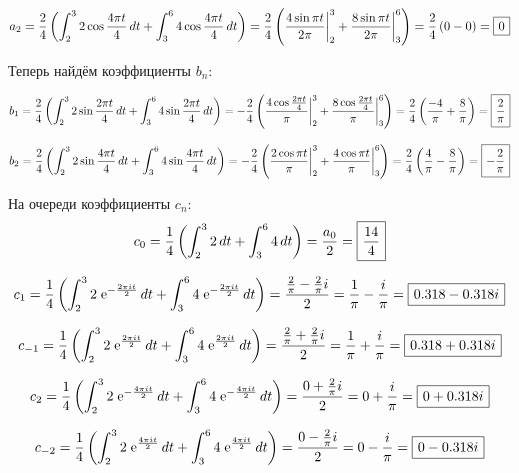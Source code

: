 \documentclass[a4paper]{article}
\newcommand*\msquared[1]{\tikz[baseline=(char.base)]{
            \node[shape=rectangle,draw,inner sep=4pt] (char) {$\displaystyle #1$};}}
\newcommand{\at}{\biggr\rvert}
\newcommand{\e}{\;\text{e}}
\begin{document}
$$a_2 = \frac{2}{4}\left( \int_{2}^{3} 2\cos\frac{4\pi t}{4}\,dt + \int_{3}^{6} 4\cos\frac{4\pi t}{4}\,dt \right) = \frac{2}{4}\left( \frac{4\sin \pi t}{2\pi}\at^3_2 + \frac{8\sin\pi t}{2\pi}\at^6_3\right) = \frac{2}{4}\left(0 - 0 \right) = \msquared{0}$$

Теперь найдём коэффициенты $b_n$:

$$b_1 = \frac{2}{4}\left( \int_{2}^{3} 2\sin\frac{2\pi t}{4}\,dt + \int_{3}^{6} 4\sin\frac{2\pi t}{4}\,dt \right) = -\frac{2}{4}\left( \frac{4\cos\frac{2\pi t}{4}}{\pi}\at_2^3 + \frac{8\cos \frac{2\pi t}{4}}{\pi}\at_3^6 \right) = \frac{2}{4}\left(\frac{-4}{\pi} + \frac{8}{\pi}\right) = \msquared{\frac{2}{\pi}}$$

$$b_2 = \frac{2}{4}\left( \int_{2}^{3} 2\sin\frac{4\pi t}{4}\,dt + \int_{3}^{6} 4\sin\frac{4\pi t}{4}\,dt \right) = -\frac{2}{4}\left( \frac{2\cos\pi t}{\pi}\at_2^3 + \frac{4\cos \pi t}{\pi}\at_3^6 \right) = \frac{2}{4}\left(\frac{4}{\pi} - \frac{8}{\pi}\right) =\msquared{-\frac{2}{\pi}}$$

На очереди коэффициенты $c_n$:
$$c_0 = \frac{1}{4}\left( \int_{2}^{3} 2\,dt + \int_{3}^{6} 4\,dt \right) = \frac{a_0}{2} = \msquared{\frac{14}{4}}$$

$$c_1 = \frac{1}{4}\left( \int_{2}^{3} 2\e^{-\frac{2\pi it}{2}}\,dt + \int_{3}^{6} 4\e^{-\frac{2 \pi it}{2}}\,dt \right) = \frac{\frac{2}{\pi}-\frac{2}{\pi}i}{2} = \frac{1}{\pi} - \frac{i}{\pi} = \msquared{0.318 - 0.318i}$$

$$c_{-1} = \frac{1}{4}\left( \int_{2}^{3} 2\e^{\frac{2\pi it}{2}}\,dt + \int_{3}^{6} 4\e^{\frac{2 \pi it}{2}}\,dt \right) = \frac{\frac{2}{\pi}+\frac{2}{\pi}i}{2} = \frac{1}{\pi} + \frac{i}{\pi} = \msquared{0.318 + 0.318i}$$

$$c_2 = \frac{1}{4}\left( \int_{2}^{3} 2\e^{-\frac{4\pi it}{2}}\,dt + \int_{3}^{6} 4\e^{-\frac{4\pi it}{2}}\,dt \right) = \frac{0 + \frac{2}{\pi}i}{2} = 0 + \frac{i}{\pi} = \msquared{0 + 0.318i}$$

$$c_{-2} = \frac{1}{4}\left( \int_{2}^{3} 2\e^{\frac{4\pi it}{2}}\,dt + \int_{3}^{6} 4\e^{\frac{4\pi it}{2}}\,dt \right) = \frac{0 - \frac{2}{\pi}i}{2} = 0 - \frac{i}{\pi} = \msquared{0 - 0.318i}$$
\end{document}

